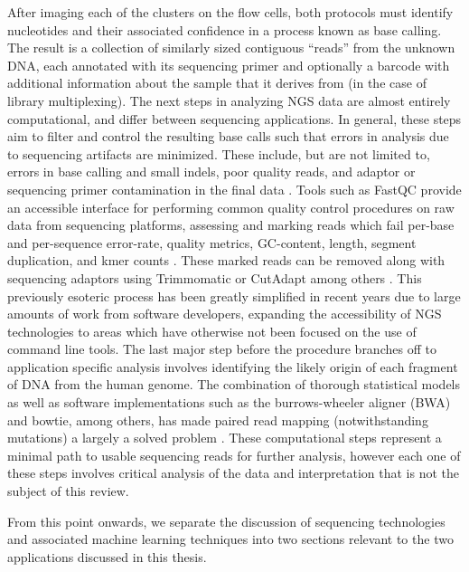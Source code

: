 After imaging each of the clusters on the flow cells, both protocols must identify nucleotides and their associated confidence in a process known as base calling. The result is a collection of similarly sized contiguous ``reads'' from the unknown DNA, each annotated with its sequencing primer and optionally a barcode with additional information about the sample that it derives from (in the case of library multiplexing). The next steps in analyzing NGS data are almost entirely computational, and differ between sequencing applications. In general, these steps aim to filter and control the resulting base calls such that errors in analysis due to sequencing artifacts are minimized. These include, but are not limited to, errors in base calling and small \glspl{indel}, poor quality reads, and adaptor or sequencing primer contamination in the final data \cite{Slatko2018}. Tools such as FastQC provide an accessible interface for performing common quality control procedures on raw data from sequencing platforms, assessing and marking reads which fail per-base and per-sequence error-rate, quality metrics, GC-content, length, segment duplication, and kmer counts \cite{Andrews2015}. These marked reads can be removed along with sequencing adaptors using Trimmomatic or CutAdapt among others \cite{Martin2011a,Bolger2014}. This previously esoteric process has been greatly simplified in recent years due to large amounts of work from software developers, expanding the accessibility of NGS technologies to areas which have otherwise not been focused on the use of command line tools. The last major step before the procedure branches off to application specific analysis involves identifying the likely origin of each fragment of DNA from the human genome. The combination of thorough statistical models as well as software implementations such as the burrows-wheeler aligner (BWA) and bowtie, among others, has made paired read mapping (notwithstanding mutations) a largely a solved problem \cite{Langmead2009,Li2009}. These computational steps represent a minimal path to usable sequencing reads for further analysis, however each one of these steps involves critical analysis of the data and interpretation that is not the subject of this review.

From this point onwards, we separate the discussion of sequencing technologies and associated machine learning techniques into two sections relevant to the two applications discussed in this thesis.


